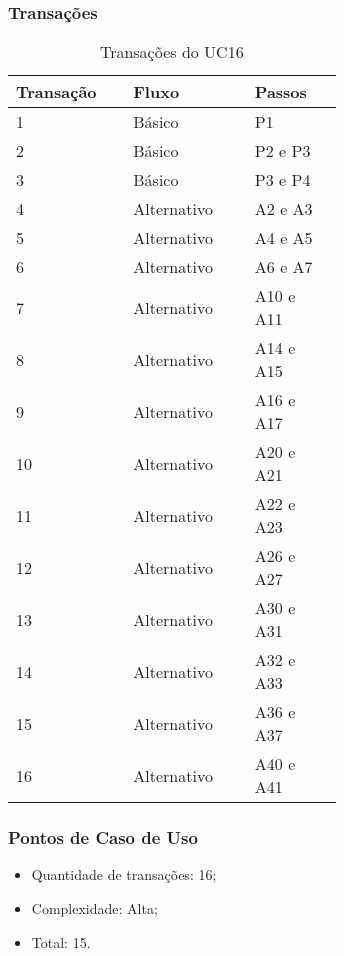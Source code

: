   \subsubsection{Transações}

  \begin{table*}[!h]
  \centering
  \caption{Transações do UC16}
  \label{uc16_transactions}
    \begin{tabular}{|p{0.20\linewidth}|p{0.25\linewidth}|p{0.20\linewidth}|}
    \hline
    \textbf{Transação} & \textbf{Fluxo} & \textbf{Passos} \\ 
    \hline
    1 & Básico & P1\\
    \hline
    2 & Básico & P2 e P3\\
    \hline
    3 & Básico & P3 e P4\\
    \hline
    4 & Alternativo & A2 e A3\\
    \hline
    5 & Alternativo & A4 e A5\\
    \hline
    6 & Alternativo & A6 e A7\\
    \hline
    7 & Alternativo & A10 e A11\\
    \hline
    8 & Alternativo & A14 e A15\\
    \hline
    9 & Alternativo & A16 e A17\\
    \hline
    10 & Alternativo & A20 e A21\\
    \hline
    11 & Alternativo & A22 e A23\\
    \hline
    12 & Alternativo & A26 e A27\\
    \hline
    13 & Alternativo & A30 e A31\\
    \hline
    14 & Alternativo & A32 e A33\\
    \hline
    15 & Alternativo & A36 e A37\\
    \hline
    16 & Alternativo & A40 e A41\\
    \hline
    \end{tabular}
  \end{table*}

  \subsubsection{Pontos de Caso de Uso}

  \begin{itemize}
  \item Quantidade de transações: 16;
  \item Complexidade: Alta;
  \item Total: 15.
  \end{itemize}

